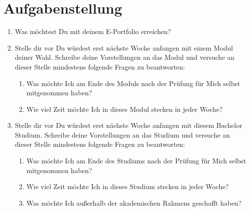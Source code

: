 \documentclass[a4paper,oneside]{scrarticle}
\begin{document}
	\section*{Aufgabenstellung}

	\begin{enumerate}
		\item Was möchtest Du mit deinem E-Portfolio erreichen?
		\item Stelle dir vor Du würdest erst nächste Woche anfangen mit einem Modul deiner Wahl. Schreibe deine Vorstellungen an das Modul und versuche an dieser Stelle mindestens folgende Fragen zu beantworten:
		\begin{enumerate}
			\item Was möchte Ich am Ende des Moduls nach der Prüfung für Mich selbst mitgenommen haben?
			\item Wie viel Zeit möchte Ich in dieses Modul stecken in jeder Woche?
		\end{enumerate}
		\item Stelle dir vor Du würdest erst nächste Woche anfangen mit diesem Bachelor Studium. Schreibe deine Vorstellungen an das Studium und versuche an dieser Stelle mindestens folgende Fragen zu beantworten:
		\begin{enumerate}
			\item Was möchte Ich am Ende des Studiums nach der Prüfung für Mich selbst mitgenommen haben?
			\item Wie viel Zeit möchte Ich in dieses Studium stecken in jeder Woche?
			\item Was möchte Ich außerhalb der akademischen Rahmens geschafft haben?
		\end{enumerate}

	\end{enumerate}
\end{document}
